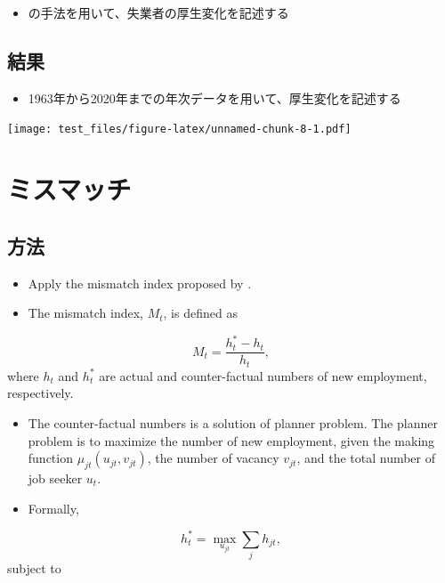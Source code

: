 \documentclass[
]{book}
\providecommand{\tightlist}{%
  \setlength{\itemsep}{0pt}\setlength{\parskip}{0pt}}
\begin{document}
\begin{itemize}
\tightlist
\item
  \citet{kawata2021welfare} の手法を用いて、失業者の厚生変化を記述する
\end{itemize}

\hypertarget{ux7d50ux679c}{%
\section{結果}\label{ux7d50ux679c}}

\begin{itemize}
\tightlist
\item
  1963年から2020年までの年次データを用いて、厚生変化を記述する
\end{itemize}

\texttt{[image: test\_files/figure-latex/unnamed-chunk-8-1.pdf]}

\hypertarget{ux30dfux30b9ux30deux30c3ux30c1}{%
\chapter{ミスマッチ}\label{ux30dfux30b9ux30deux30c3ux30c1}}

\hypertarget{ux65b9ux6cd5-1}{%
\section{方法}\label{ux65b9ux6cd5-1}}

\begin{itemize}
\item
  Apply the mismatch index proposed by \citet{csahin2014mismatch}.
\item
  The mismatch index, \(M_t\), is defined as
\end{itemize}

\[M_t = \frac{h_t^{*}-h_t}{h_t},\]
where \(h_t\) and \(h_t^*\) are actual and counter-factual numbers of new employment, respectively.

\begin{itemize}
\item
  The counter-factual numbers is a solution of planner problem.
  The planner problem is to maximize the number of new employment, given the making function \(\mu_{jt}(u_{jt},v_{jt})\), the number of vacancy \(v_{jt}\), and the total number of job seeker \(u_{t}\).
\item
  Formally,
\end{itemize}

\[h_t^*=\max_{u_{jt}} \sum_j h_{jt},\]
subject to
\end{document}
